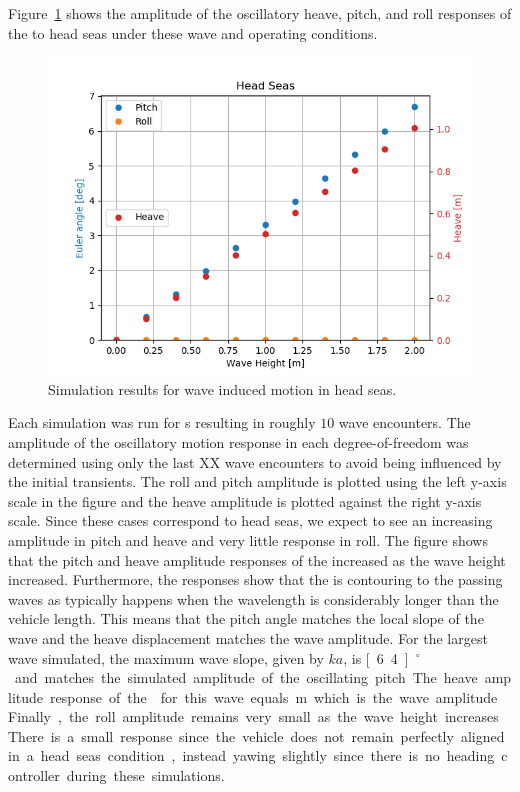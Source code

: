 \documentclass[utf8]{frontiersSCNS} %
\begin{document}
Figure~\ref{f:head_seas} shows the amplitude of the oscillatory heave, pitch, and roll responses of the \wamv{} to head seas under these wave and operating conditions.
%
\begin{figure}[h]
  \centering
  \includegraphics[width=\SFc\textwidth]{images/2020_08_25_head_seas_001.png}
  \caption{Simulation results for wave induced motion in head seas.}
  \label{f:head_seas}
\end{figure}
%
Each simulation was run for \unit[60]{s} resulting in roughly $10$ wave encounters. The amplitude of the oscillatory motion response in each degree-of-freedom was determined using only the last XX wave encounters to avoid being influenced by the initial transients. The roll and pitch amplitude is plotted using the left y-axis scale in the figure and the heave amplitude is plotted against the right y-axis scale. Since these cases correspond to head seas, we expect to see an increasing amplitude in pitch and heave and very little response in roll. The figure shows that the pitch and heave amplitude responses of the \wamv{} increased as the wave height increased. Furthermore, the responses show that the \wamv{} is contouring to the passing waves as typically happens when the wavelength is considerably longer than the vehicle length. This means that the pitch angle matches the local slope of the wave and the heave displacement matches the wave amplitude. For the largest wave simulated, the maximum wave slope, given by $ka$, is \unit[6.4]{$^\circ$} and matches the simulated amplitude of the oscillating pitch. The heave amplitude response of the \wamv{} for this wave equals \unit[1]{m} which is the wave amplitude. Finally, the roll amplitude remains very small as the wave height increases. There is a small response since the vehicle does not remain perfectly aligned in a head seas condition, instead yawing slightly since there is no heading controller during these simulations.
\end{document}
